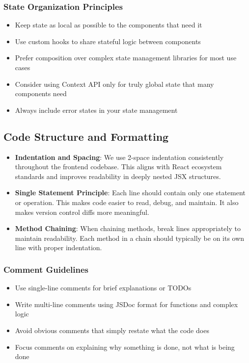 \documentclass[12pt]{article}
\begin{document}
\subsubsection{State Organization Principles}
\begin{itemize}
    \item Keep state as local as possible to the components that need it
    \item Use custom hooks to share stateful logic between components
    \item Prefer composition over complex state management libraries for most use cases
    \item Consider using Context API only for truly global state that many components need
    \item Always include error states in your state management
\end{itemize}

\subsection{Code Structure and Formatting}

\begin{itemize}
    \item \textbf{Indentation and Spacing}: We use 2-space indentation consistently throughout the frontend codebase. This aligns with React ecosystem standards and improves readability in deeply nested JSX structures.
    
    \item \textbf{Single Statement Principle}: Each line should contain only one statement or operation. This makes code easier to read, debug, and maintain. It also makes version control diffs more meaningful.
    
    \item \textbf{Method Chaining}: When chaining methods, break lines appropriately to maintain readability. Each method in a chain should typically be on its own line with proper indentation.
\end{itemize}

\subsubsection{Comment Guidelines}
\begin{itemize}
    \item Use single-line comments for brief explanations or TODOs
    \item Write multi-line comments using JSDoc format for functions and complex logic
    \item Avoid obvious comments that simply restate what the code does
    \item Focus comments on explaining why something is done, not what is being done
\end{itemize}
\end{document}
